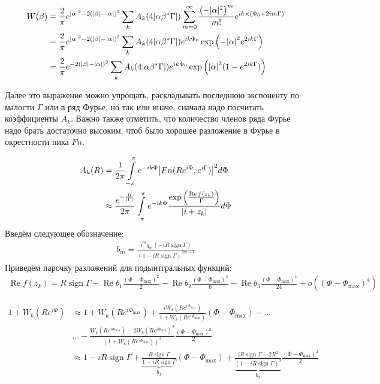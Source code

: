 \documentclass[a4paper, 12pt]{article}
\DeclareMathOperator*{\sign}{sign}
\DeclareMathOperator*{\Real}{Re}
\newenvironment{eqw}{\begin{equation} \begin{aligned}}   
    {\end{aligned}    \end{equation}}
\begin{document}
\begin{eqw}
    W(\beta) &= \frac{2}{\pi}e^{\abs{\alpha}^2-2\left(\abs{\beta} - \abs{\alpha}\right)^2}
    \sum\limits_k A_k(4\abs{\alpha\beta^*\Gamma})
    \sum\limits_{m=0}^{\infty} \frac{\left(-|\alpha|^2\right)^m}{m!}e^{ik\times\left(\Phi_0+2im\Gamma\right)}\\
    &= \frac{2}{\pi}e^{\abs{\alpha}^2-2\left(\abs{\beta} - \abs{\alpha}\right)^2}
    \sum\limits_k A_k(4\abs{\alpha\beta^*\Gamma})e^{ik\Phi_0}
    \exp\left(-\abs{\alpha}^2 e^{2ik\Gamma}\right)\\
    &= \frac{2}{\pi}e^{-2\left(\abs{\beta} - \abs{\alpha}\right)^2}
    \sum\limits_k A_k(4\abs{\alpha\beta^*\Gamma})e^{ik\Phi_0}
    \exp\left(\abs{\alpha}^2 (1-e^{2ik\Gamma})\right)
\end{eqw}

Далее это выражение можно упрощать, раскладывать последнюю экспоненту по малости $\Gamma$ или в ряд Фурье, но так или иначе, сначала надо посчитать коэффициенты $A_k$. Важно также отметить, что количество членов ряда Фурье надо брать достаточно высоким, чтоб было хорошее разложение в Фурье в окрестности пика $Fn$. 

\begin{eqw}
     A_k(R) &= \frac{1}{2\pi}\int\limits_{-\pi}^\pi e^{-ik\Phi} \abs{Fn(Re^{i\Phi}, e^{i\Gamma})}^2 d\Phi \\
    &\approx \frac{e^{-\frac{R}{\abs{\Gamma}}}}{2\pi}\int\limits_{-\pi}^\pi e^{-ik\Phi} 
    \frac{\exp\left(\frac{\Real f(z_k)}{\Gamma}\right)}{\abs{i+z_k}}d\Phi 
\end{eqw}
Введём следующее обозначение:
\begin{eqw}
    b_m = \frac{i^m q_m(-iR\sign\Gamma)}{\left(1-iR\sign \Gamma\right)^{2m-1}}
\end{eqw}
Приведём парочку разложений для подынтгральных функций:
\begin{eqw}
    \Real f(z_k) = R\sign\Gamma - \Real b_1 \frac{\left(\Phi - \Phi_{\max}\right)^2}{2} - \Real b_2 \frac{\left(\Phi - \Phi_{\max}\right)^3}{6} - \Real b_3 \frac{\left(\Phi - \Phi_{\max}\right)^4}{24}+o\left(\left(\Phi - \Phi_{\max}\right)^4\right)
\end{eqw}

\begin{eqw}
     1+W_k(Re^{i\Phi}) &\approx 1+W_k(Re^{i\Phi_{\max}}) + 
     \frac{iW_k(Re^{i\Phi_{\max}})}{1+W_k(Re^{i\Phi_{\max}})}\left(\Phi - \Phi_{\max}\right) - \dots\\
     &\dots-\frac{W_k(Re^{i\Phi_{\max}}) - 2W_k(Re^{i\Phi_{\max}})^2}{\left(1+W_k(Re^{i\Phi_{\max}})\right)^3}\frac{\left(\Phi - \Phi_{\max}\right)^2}{2}\\
     &\approx 1- i R \sign \Gamma + \underbrace{\frac{R \sign \Gamma}{1-i R \sign \Gamma}}_{b_1}\left(\Phi - \Phi_{\max}\right) +
     \underbrace{\frac{i R \sign \Gamma - 2 R^2}{\left(1-i R \sign \Gamma\right)^3}}_{b_2}\frac{\left(\Phi - \Phi_{\max}\right)^2}{2}
\end{eqw}
\end{document}
